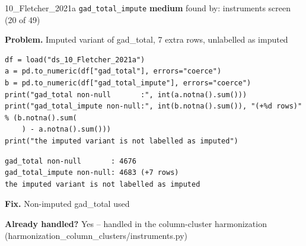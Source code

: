\documentclass[9pt, t, handout]{beamer}
\newcommand{\ans}[1]{\textcolor{structure.fg}{#1}}
\begin{document}
\begin{frame}[fragile]{10\_Fletcher\_2021a \quad \texttt{gad\_total\_impute}}
  {\scriptsize\textcolor{blue!55!black}{\textbf{medium}} \quad
   found by: instruments screen \quad (20 of 49)}
  \vspace{3pt}

  {\footnotesize \textbf{Problem.} Imputed variant of gad\_total, 7 extra rows, unlabelled as imputed}
  \vspace{4pt}

  \begin{Verbatim}[fontsize=\tiny, frame=single, framesep=2pt, label=\tiny reproduce]
df = load("ds_10_Fletcher_2021a")
a = pd.to_numeric(df["gad_total"], errors="coerce")
b = pd.to_numeric(df["gad_total_impute"], errors="coerce")
print("gad_total non-null       :", int(a.notna().sum()))
print("gad_total_impute non-null:", int(b.notna().sum()), "(+%d rows)" % (b.notna().sum(
    ) - a.notna().sum()))
print("the imputed variant is not labelled as imputed")
  \end{Verbatim}
  \begin{Verbatim}[fontsize=\tiny, frame=single, framesep=2pt, label=\tiny output]
gad_total non-null       : 4676
gad_total_impute non-null: 4683 (+7 rows)
the imputed variant is not labelled as imputed
  \end{Verbatim}
  \vspace{2pt}

  {\footnotesize \textbf{Fix.} Non-imputed gad\_total used}
  \vspace{2pt}

  {\footnotesize \textbf{Already handled?} \ans{Yes} -- handled in the column-cluster harmonization
   (harmonization\_column\_clusters/instruments.py)}
\end{frame}
\end{document}
